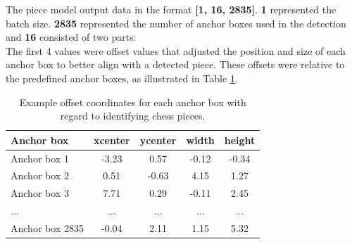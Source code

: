 The piece model output data in the format \textbf{[1, 16, 2835]}. \textbf{1} represented the batch size. \textbf{2835} represented the number of anchor boxes used in the detection and \textbf{16} consisted of two parts: \\

The first 4 values were offset values that adjusted the position and size of each anchor box to better align with a detected piece. These offsets were relative to the predefined anchor boxes, as illustrated in Table \ref{tab:piece-offset-table}.

\begin{table}[h]
    \centering
    \caption[Offset values for anchor boxes (chess pieces)]{Example offset coordinates for each anchor box with regard to identifying chess pieces.}  %
    \renewcommand{\arraystretch}{1.5} %
    \begin{tabular}{lcccc}
        \toprule
        \textbf{Anchor box} & \textbf{xcenter} & \textbf{ycenter} & \textbf{width} & \textbf{height} \\
        \midrule
        Anchor box 1 & -3.23 & 0.57 & -0.12 & -0.34 \\
        Anchor box 2 & 0.51 & -0.63 & 4.15 & 1.27 \\
        Anchor box 3 & 7.71 & 0.29 & -0.11 & 2.45 \\
        ... & ... & ... & ... & ... \\
        Anchor box 2835 & -0.04 & 2.11 & 1.15 & 5.32 \\
        \bottomrule
    \end{tabular}
    \label{tab:piece-offset-table}
\end{table}



